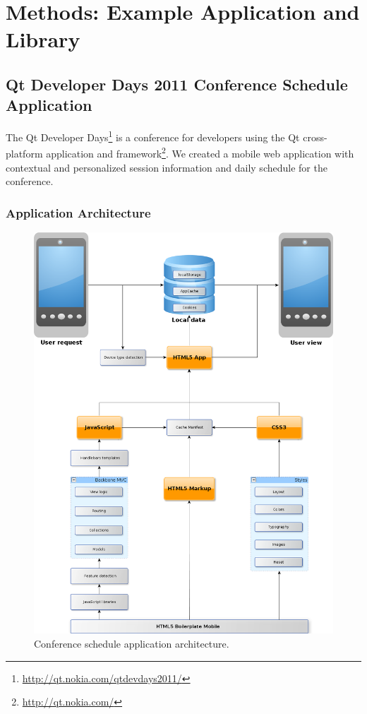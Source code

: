 \chapter{Methods: Example Application and Library}
\label{chapter:methods}

\section{Qt Developer Days 2011 Conference Schedule Application}
\label{section:devdays}

The Qt Developer
Days\footnote{\url{http://qt.nokia.com/qtdevdays2011/}} is a
conference for developers using the Qt cross-platform application and
 framework\footnote{\url{http://qt.nokia.com/}}. We created a
mobile web application with contextual and personalized session
information and daily schedule for the conference.

\subsection{Application Architecture}

\begin{figure}[ht]
  \begin{center}
    \includegraphics[width=\textwidth]{images/devdays.png}
    \caption{Conference schedule application architecture.}
    \label{figure:devdays.png}
  \end{center}
\end{figure}

